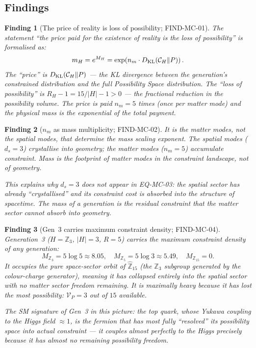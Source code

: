 \documentclass[12pt, a4paper]{article}
\newtheorem{finding}{Finding}[section]
\begin{document}
\subsection{Findings}
\label{zc16:sec:findings}

\begin{finding}[The price of reality is loss of possibility;
  FIND-MC-01]
\label{zc16:find:price}
The statement ``the price paid for the existence of reality
is the loss of possibility'' is formalised as:
\[
  m_H = e^{M_H}
  = \exp\!\left(n_m \cdot D_{\rm KL}\!\left(
  \mathcal{C}_H \| P\right)\right).
\]
The ``price'' is $D_{\rm KL}(\mathcal{C}_H \| P)$ ---
the KL divergence between the generation's constrained
distribution and the full Possibility Space distribution.
The ``loss of possibility'' is $R_H - 1 = 15/|H| - 1 > 0$
--- the fractional reduction in the possibility volume.
The price is paid $n_m = 5$ times (once per matter mode)
and the physical mass is the exponential of the total payment.
\end{finding}

\begin{finding}[$n_m$ as mass multiplicity; FIND-MC-02]
\label{zc16:find:nm-multiplicity}
It is the \emph{matter} modes, not the spatial modes, that
determine the mass scaling exponent. The spatial modes
($d_s = 3$) crystallise into geometry; the matter modes
($n_m = 5$) accumulate constraint. Mass is the footprint
of matter modes in the constraint landscape, not of
geometry.

This explains why $d_s = 3$ does not appear in EQ-MC-03:
the spatial sector has already ``crystallised'' and its
constraint cost is absorbed into the structure of spacetime.
The mass of a generation is the residual constraint that
the matter sector cannot absorb into geometry.
\end{finding}

\begin{finding}[Gen~3 carries maximum constraint density;
  FIND-MC-04]
\label{zc16:find:gen3}
Generation~3 ($H = \mathbb{Z}_3$, $|H| = 3$, $R = 5$)
carries the maximum constraint density of any generation:
\[
  M_{\mathbb{Z}_3} = 5\log 5 \approx 8.05,\quad
  M_{\mathbb{Z}_5} = 5\log 3 \approx 5.49,\quad
  M_{\mathbb{Z}_{15}} = 0.
\]
It occupies the pure space-sector orbit of
$\widehat{\mathbb{Z}}_{15}$ (the $\mathbb{Z}_3$ subgroup
generated by the colour-charge generator), meaning it has
collapsed entirely into the spatial sector with no matter
sector freedom remaining. It is maximally heavy because it
has lost the most possibility: $\mathcal{V}_P = 3$ out of
$15$ available.

The SM signature of Gen~3 in this picture: the top quark,
whose Yukawa coupling to the Higgs field $\approx 1$, is
the fermion that has most fully ``resolved'' its possibility
space into actual constraint --- it couples almost perfectly
to the Higgs precisely because it has almost no remaining
possibility freedom.
\end{finding}
\end{document}
